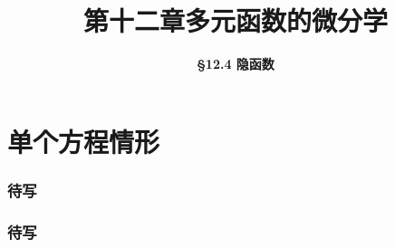 \everymath{\displaystyle}



\title[第十二章\\
多元微分学]{\texorpdfstring{\LARGE \bfseries 第十二章\quad 多元函数的微分学}{第十二章 多元函数的微分学}} %
\author[\smaller \S 12.4\\
隐函数] %
{\Large \bfseries \S 12.4 隐函数}
\date{}





\begin{frame}

\titlepage %

\end{frame}



\section{单个方程情形}


\begin{frame}
\frametitle{待写}

\end{frame}


\begin{frame}
\frametitle{待写}

\end{frame}


